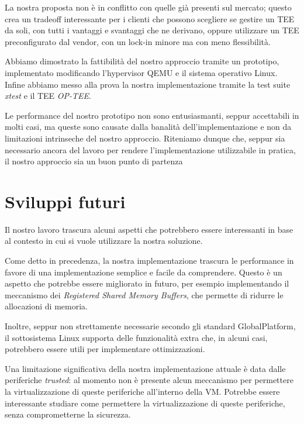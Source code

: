\documentclass[12pt,italian]{report}
\begin{document}
La nostra proposta non è in conflitto con quelle già presenti sul mercato;
questo crea un tradeoff interessante per i clienti che possono scegliere
se gestire un TEE da soli, con tutti i vantaggi e svantaggi che ne derivano,
oppure utilizzare un TEE preconfigurato dal vendor, con un lock-in minore
ma con meno flessibilità.

Abbiamo dimostrato la fattibilità del nostro approccio tramite un prototipo,
implementato modificando l'hypervisor QEMU e il sistema operativo Linux.
Infine abbiamo messo alla prova la nostra implementazione tramite la test
suite \textit{xtest} e il TEE \textit{OP-TEE}.

Le performance del nostro prototipo non sono entusiasmanti, seppur accettabili
in molti casi, ma queste sono causate dalla banalità dell'implementazione e
non da limitazioni intrinseche del nostro approccio.
Riteniamo dunque che, seppur sia necessario ancora del lavoro per rendere
l'implementazione utilizzabile in pratica, il nostro approccio sia un buon
punto di partenza

\section{Sviluppi futuri}
\label{sec:sviluppi-futuri}
Il nostro lavoro trascura alcuni aspetti che potrebbero essere interessanti
in base al contesto in cui si vuole utilizzare la nostra soluzione.

Come detto in precedenza, la nostra implementazione trascura le performance in
favore di una implementazione semplice e facile da comprendere.
Questo è un aspetto che potrebbe essere migliorato in futuro, per esempio
implementando il meccanismo dei \textit{Registered Shared Memory Buffers},
che permette di ridurre le allocazioni di memoria.

Inoltre, seppur non strettamente necessarie secondo gli standard GlobalPlatform,
il sottosistema Linux supporta delle funzionalità extra che, in alcuni casi,
potrebbero essere utili per implementare ottimizzazioni.

\bigbreak \noindent

Una limitazione significativa della nostra implementazione attuale è data dalle
periferiche \textit{trusted}: al momento non è presente alcun meccanismo per
permettere la virtualizzazione di queste periferiche all'interno della VM.
Potrebbe essere interessante studiare come permettere la virtualizzazione
di queste periferiche, senza comprometterne la sicurezza.

\bigbreak \noindent
\end{document}
